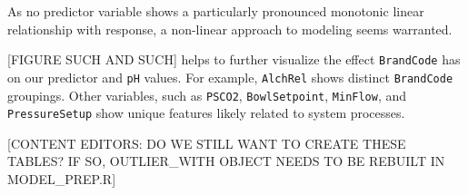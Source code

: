 \documentclass[]{report}
\newenvironment{Shaded}{\begin{snugshade}}{\end{snugshade}}
\newcommand{\DataTypeTok}[1]{\textcolor[rgb]{0.13,0.29,0.53}{#1}}
\newcommand{\DecValTok}[1]{\textcolor[rgb]{0.00,0.00,0.81}{#1}}
\newcommand{\FloatTok}[1]{\textcolor[rgb]{0.00,0.00,0.81}{#1}}
\newcommand{\KeywordTok}[1]{\textcolor[rgb]{0.13,0.29,0.53}{\textbf{#1}}}
\newcommand{\NormalTok}[1]{#1}
\newcommand{\OperatorTok}[1]{\textcolor[rgb]{0.81,0.36,0.00}{\textbf{#1}}}
\newcommand{\StringTok}[1]{\textcolor[rgb]{0.31,0.60,0.02}{#1}}
\begin{document}
\begin{Shaded}
\end{Shaded}

As no predictor variable shows a particularly pronounced monotonic
linear relationship with response, a non-linear approach to modeling
seems warranted.

{[}FIGURE SUCH AND SUCH{]} helps to further visualize the effect
\texttt{BrandCode} has on our predictor and \texttt{pH} values. For
example, \texttt{AlchRel} shows distinct \texttt{BrandCode} groupings.
Other variables, such as \texttt{PSCO2}, \texttt{BowlSetpoint},
\texttt{MinFlow}, and \texttt{PressureSetup} show unique features likely
related to system processes.

{[}CONTENT EDITORS: DO WE STILL WANT TO CREATE THESE TABLES? IF SO,
OUTLIER\_WITH OBJECT NEEDS TO BE REBUILT IN MODEL\_PREP.R{]}
\end{document}
